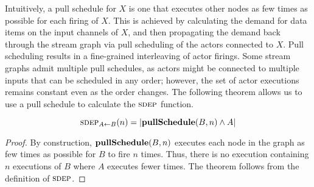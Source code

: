 Intuitively, a pull schedule for $X$ is one that executes other nodes
as few times as possible for each firing of $X$.  This is achieved by
calculating the demand for data items on the input channels of $X$,
and then propagating the demand back through the stream graph via pull
scheduling of the actors connected to $X$.  Pull scheduling results in
a fine-grained interleaving of actor firings.  Some stream graphs
admit multiple pull schedules, as actors might be connected to
multiple inputs that can be scheduled in any order; however, the set
of actor executions remains constant even as the order changes.  The
following theorem allows us to use a pull schedule to calculate the
$\textsc{sdep}$ function.
\begin{theorem} 
\label{thm1}
\[
\sdepf{A}{B}(n) = |{\bf pullSchedule}(B, n) \wedge A|
\]
\end{theorem}
\begin{proof}
By construction, ${\bf pullSchedule}(B, n)$ executes each node in the
graph as few times as possible for $B$ to fire $n$ times.  Thus, there
is no execution containing $n$ executions of $B$ where $A$ executes
fewer times.  The theorem follows from the definition of $\textsc{sdep}$.
\end{proof}

